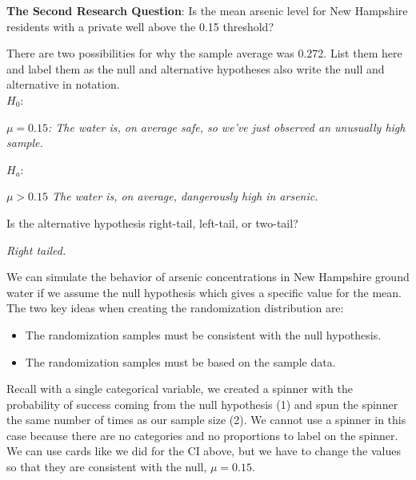 {\bf The Second Research Question}: Is the mean arsenic level
for New Hampshire residents with a private well above the 0.15 threshold? 


  There are two possibilities for why the sample average
was 0.272.  List them here and label them as the null and alternative
hypotheses also write the null and alternative in notation.\\
$H_0:$ 
\begin{students}
  \vspace{1cm}
\end{students}
\begin{key}
  {\it   $ \mu = 0.15$:  The water is, on average safe, so we've just
  observed an unusually high sample.}
\end{key}

$H_a:$
\begin{students}
  \vspace{1cm}
\end{students}
\begin{key}
  {\it  $ \mu > 0.15$  The water is, on average, dangerously high in arsenic.}
\end{key}

Is the alternative hypothesis right-tail, left-tail, or two-tail?
\begin{students}
  \vspace{1cm}
\end{students}

\begin{key}
  {\it Right tailed.}
\end{key}

We can simulate the behavior of arsenic concentrations in New
Hampshire ground water if we assume the null hypothesis which gives a
specific value for the mean.  The two key ideas when creating the
randomization distribution are:
\begin{itemize}
\item 
 The randomization samples must be consistent with the null hypothesis.
\item 
 The randomization samples must be based on the sample data.
\end{itemize}

Recall with a single categorical variable, we created a spinner with the probability of success coming from the null hypothesis (1) and spun the spinner the same number of times as our sample size (2).  We cannot use a spinner 
in this case because there are no categories and no proportions to
label on the spinner.  We can use cards like we did for the CI above,
but we have to change the values so that they are consistent with the
null, $\mu = 0.15$.

